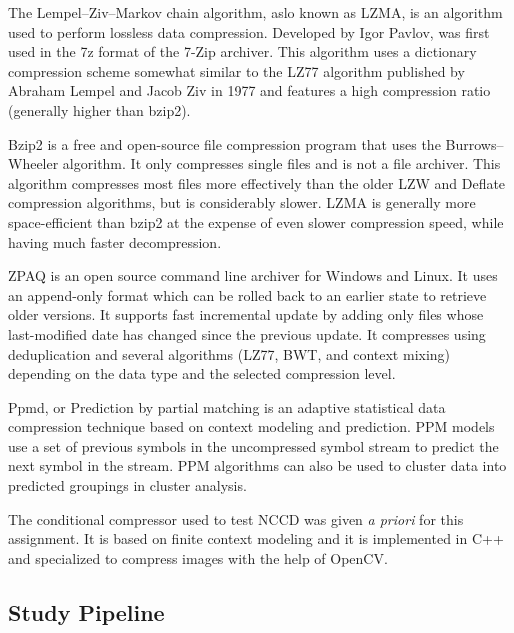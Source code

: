 \documentclass[12pt]{article}
\begin{document}
The Lempel–Ziv–Markov chain algorithm, aslo known as LZMA, is an algorithm used to perform lossless data compression. 
Developed by Igor Pavlov, was first used in the 7z format of the 7-Zip archiver. 
This algorithm uses a dictionary compression scheme somewhat similar to the LZ77 algorithm published by Abraham Lempel and Jacob Ziv in 1977 and features a high 
compression ratio (generally higher than bzip2).

Bzip2 is a free and open-source file compression program that uses the Burrows–Wheeler algorithm. 
It only compresses single files and is not a file archiver. 
This algorithm compresses most files more effectively than the older LZW and Deflate compression algorithms, but is considerably slower. 
LZMA is generally more space-efficient than bzip2 at the expense of even slower compression speed, while having much faster decompression.

ZPAQ is an open source command line archiver for Windows and Linux. 
It uses an append-only format which can be rolled back to an earlier state to retrieve older versions. 
It supports fast incremental update by adding only files whose last-modified date has changed since the previous update. 
It compresses using deduplication and several algorithms (LZ77, BWT, and context mixing) depending on the data type and the selected compression level.

Ppmd, or Prediction by partial matching is an adaptive statistical data compression technique based on context modeling and prediction. 
PPM models use a set of previous symbols in the uncompressed symbol stream to predict the next symbol in the stream. 
PPM algorithms can also be used to cluster data into predicted groupings in cluster analysis.
\newline

The conditional compressor used to test NCCD was given \textit{a priori} for this assignment.
It is based on finite context modeling and it is implemented in C++ and specialized to compress images with the help of OpenCV.

\subsection{Study Pipeline} \label{pipeline} %
\end{document}
